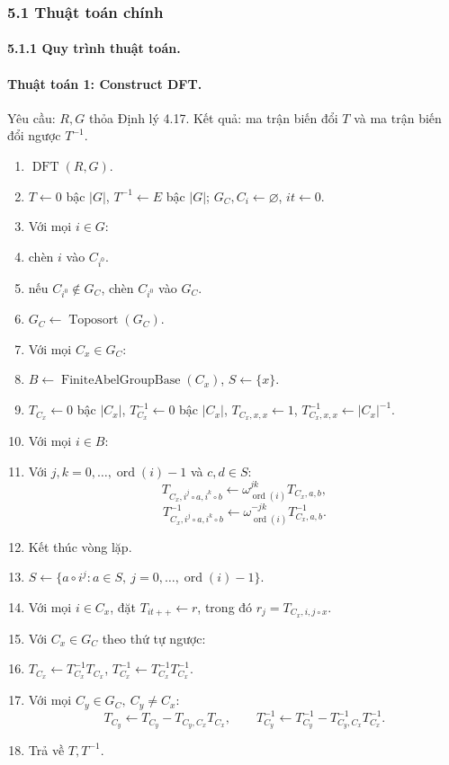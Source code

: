\documentclass[11pt]{article}
\begin{document}
\subsubsection*{5.1 Thuật toán chính}

\paragraph{5.1.1 Quy trình thuật toán.}

\paragraph{Thuật toán 1: Construct DFT.}
Yêu cầu: \(R,G\) thỏa Định lý 4.17. Kết quả: ma trận biến đổi \(T\) và ma trận
biến đổi ngược \(T^{-1}\).
\begin{enumerate}[label=\arabic*:,leftmargin=3.2em]
  \item \(\operatorname{DFT}(R,G)\).
  \item \(T\gets0\) bậc \(|G|\), \(T^{-1}\gets E\) bậc \(|G|\);
  \(G_C,C_i\gets\varnothing\), \(it\gets0\).
  \item Với mọi \(i\in G\):
  \item \quad chèn \(i\) vào \(C_{i^0}\).
  \item \quad nếu \(C_{i^0}\notin G_C\), chèn \(C_{i^0}\) vào \(G_C\).
  \item \(G_C\gets\operatorname{Toposort}(G_C)\).
  \item Với mọi \(C_x\in G_C\):
  \item \quad \(B\gets\operatorname{FiniteAbelGroupBase}(C_x)\), \(S\gets\{x\}\).
  \item \quad \(T_{C_x}\gets0\) bậc \(|C_x|\), \(T^{-1}_{C_x}\gets0\) bậc
  \(|C_x|\), \(T_{C_x,x,x}\gets1\), \(T^{-1}_{C_x,x,x}\gets |C_x|^{-1}\).
  \item \quad Với mọi \(i\in B\):
  \item \quad\quad Với \(j,k=0,\ldots,\operatorname{ord}(i)-1\) và \(c,d\in S\):
  \[
    T_{C_x,i^j\circ a,i^k\circ b}\gets
    \omega_{\operatorname{ord}(i)}^{jk}T_{C_x,a,b},
  \]
  \[
    T^{-1}_{C_x,i^j\circ a,i^k\circ b}\gets
    \omega_{\operatorname{ord}(i)}^{-jk}T^{-1}_{C_x,a,b}.
  \]
  \item \quad\quad Kết thúc vòng lặp.
  \item \quad\quad \(S\gets\{a\circ i^j:a\in S,\ j=0,\ldots,\operatorname{ord}(i)-1\}\).
  \item \quad Với mọi \(i\in C_x\), đặt \(T_{it++}\gets r\), trong đó
  \(r_j=T_{C_x,i,j\circ x}\).
  \item Với \(C_x\in G_C\) theo thứ tự ngược:
  \item \quad \(T_{C_x}\gets T^{-1}_{C_x}T_{C_x}\),
  \(T^{-1}_{C_x}\gets T^{-1}_{C_x}T^{-1}_{C_x}\).
  \item \quad Với mọi \(C_y\in G_C,\ C_y\ne C_x\):
  \[
    T_{C_y}\gets T_{C_y}-T_{C_y,C_x}T_{C_x},\qquad
    T^{-1}_{C_y}\gets T^{-1}_{C_y}-T^{-1}_{C_y,C_x}T^{-1}_{C_x}.
  \]
  \item Trả về \(T,T^{-1}\).
\end{enumerate}
\end{document}
